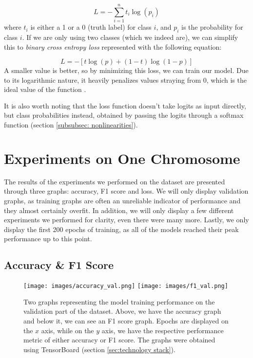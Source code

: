 \documentclass[times, utf8, diplomski, english]{fer_eng}
\begin{document}
\[ L = - \sum_{i = 1}^n t_i \log (p_i) \]
where $t_i$ is either a 1 or a 0 (truth label) for class $i$, and $p_i$ is the probability for class $i$. If we are only using two classes (which we indeed are), we can simplify this to \textit{binary cross entropy loss} represented with the following equation:

\[ L = - [t \log (p) + (1 - t) \log (1 - p)] \]
A smaller value is better, so by minimizing this loss, we can train our model. Due to its logarithmic nature, it heavily penalizes values straying from 0, which is the ideal value of the function \cite{CEL}.

It is also worth noting that the loss function doesn't take logits as input directly, but class probabilities instead, obtained by passing the logits through a softmax function (section \ref{subsubsec: nonlinearities}).

\section{Experiments on One Chromosome}
\label{sec:experiments on one chromosome}

The results of the experiments we performed on the dataset are presented through three graphs: accuracy, F1 score and loss. We will only display validation graphs, as training graphs are often an unreliable indicator of performance and they almost certainly overfit. In addition, we will only display a few different experiments we performed for clarity, even there were many more. Lastly, we only display the first 200 epochs of training, as all of the models reached their peak performance up to this point.

\subsection{Accuracy \& F1 Score}

\begin{figure}[h]
	\centering
	\texttt{[image: images/accuracy\_val.png]}
	\texttt{[image: images/f1\_val.png]}
	\caption[Accuracy and f1 graph]{Two graphs representing the model training performance on the validation part of the dataset. Above, we have the accuracy graph and below it, we can see an F1 score graph. Epochs are displayed on the $x$ axis, while on the $y$ axis, we have the respective performance metric of either accuracy or F1 score. The graphs were obtained using TensorBoard (section \ref{sec:technology stack}).}
	\label{fig:accuracy and f1 graph}
\end{figure}
\end{document}
